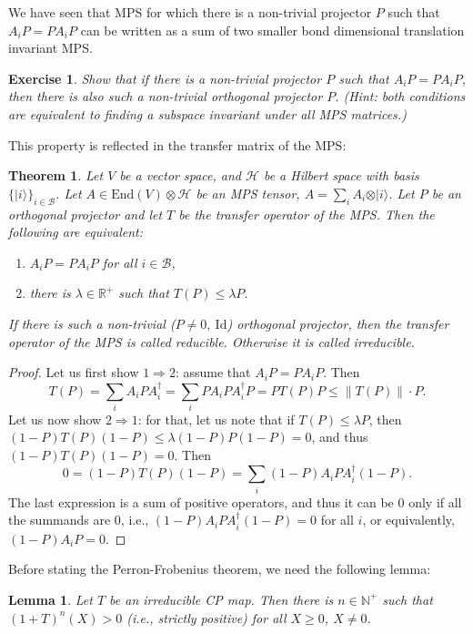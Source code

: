 \documentclass{article}
\newtheorem{lemma}{Lemma}
\newtheorem{theorem}{Theorem}
\newtheorem{exercise}{Exercise}
\newcommand{\id}{\mathrm{Id}}
\newcommand{\End}{\mathrm{End}}
\newcommand{\ket}[1]{\vert #1 \rangle}
\begin{document}
We have seen that MPS for which there is a non-trivial projector $P$ such that $A_iP = PA_iP$ can be written as a sum of two smaller bond dimensional translation invariant MPS. 
\begin{exercise}
  Show that if there is a non-trivial projector $P$ such that $A_iP = PA_iP$, then there is also such a non-trivial \emph{orthogonal} projector $P$. (Hint: both conditions are equivalent to finding a subspace invariant under all MPS matrices.)
\end{exercise}
This property is reflected in the transfer matrix of the MPS:
\begin{theorem}
  Let $V$ be a vector space, and $\mathcal{H}$ be a Hilbert space with basis $\{\ket{i}\}_{i\in \mathcal{B}}$. Let $A\in \End(V)\otimes \mathcal{H}$ be an MPS tensor, $A = \sum_i A_i \otimes \ket{i}$. Let $P$ be an orthogonal projector and let $T$ be the transfer operator of the MPS. Then the following are equivalent:
  \begin{enumerate}
    \item  $A_i P = P A_i P$ for all $i\in \mathcal{B}$,
    \item there is $\lambda\in \mathbb{R}^+$ such that $T(P)\leq \lambda P$.
  \end{enumerate}
  If there is such a non-trivial ($P\neq 0, \ \id$) orthogonal projector, then the transfer operator of the MPS is called \emph{reducible}. Otherwise it is called \emph{irreducible}.
\end{theorem}

\begin{proof}
  Let us first show $1\Rightarrow 2$: assume that $A_i P = P A_i P$. Then
  \begin{equation*}
    T(P) = \sum_i A_i P A_i^\dagger = \sum_i PA_iPA_i^\dagger P = PT(P)P \leq  \|T(P)\| \cdot P.
  \end{equation*}
  Let us now show $2\Rightarrow 1$: for that, let us note that if $T(P)\leq \lambda P$, then $(1-P) T(P) (1-P) \leq \lambda (1-P)P(1-P) = 0$, and thus $(1-P) T(P) (1-P) = 0$. Then
  \begin{equation*}
    0 = (1-P)T(P)(1-P) = \sum_i (1-P)A_i P A_i^\dagger (1-P).
  \end{equation*} 
  The last expression is a sum of positive operators, and thus it can be $0$ only if all the summands are $0$, i.e., $(1-P)A_i P A_i^\dagger (1-P) = 0$  for all $i$, or equivalently, $(1-P)A_i P =0$. 
\end{proof}

Before stating the Perron-Frobenius theorem, we need the following lemma:
\begin{lemma}\label{lem:irreducible_invertibility}
  Let $T$ be an irreducible CP map. Then there is $n\in \mathbb{N}^+$ such that $(1+T)^n(X) > 0$ (i.e., strictly positive) for all $X\geq 0$, $X\neq 0$.
\end{lemma}
\end{document}

